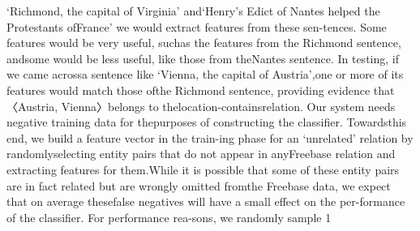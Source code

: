 ‘Richmond, the capital of Virginia’ and‘Henry’s Edict of Nantes helped the Protestants ofFrance’ we would extract features from these sen-tences.  Some features would be very useful, suchas the features from the Richmond sentence, andsome  would  be  less  useful,  like  those  from  theNantes  sentence.   In  testing,  if  we  came  acrossa  sentence  like  ‘Vienna,  the  capital  of  Austria’,one or more of its features would match those ofthe  Richmond  sentence,  providing  evidence  that〈Austria, Vienna〉belongs  to  thelocation-containsrelation. Our system needs negative training data for thepurposes  of  constructing  the  classifier.   Towardsthis  end,  we  build  a  feature  vector  in  the  train-ing phase for an ‘unrelated’ relation by randomlyselecting  entity  pairs  that  do  not  appear  in  anyFreebase relation and extracting features for them.While it is possible that some of these entity pairs are in fact related but are wrongly omitted fromthe Freebase data, we expect that on average thesefalse negatives will have a small effect on the per-formance of the classifier.   For performance rea-sons, we randomly sample 1%











